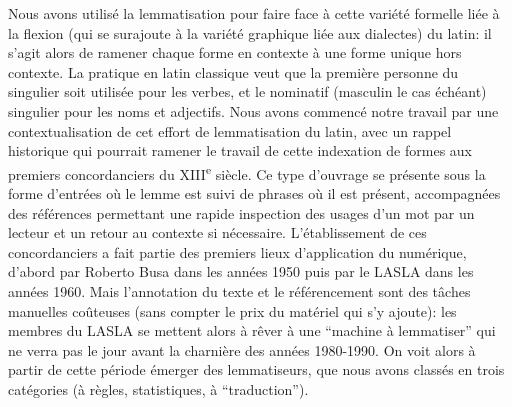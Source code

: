 Nous avons utilisé la lemmatisation pour faire face à cette variété formelle liée à la flexion (qui se surajoute à la variété graphique liée aux dialectes) du latin: il s'agit alors de ramener chaque forme en contexte à une forme unique hors contexte. La pratique en latin classique veut que la première personne du singulier soit utilisée pour les verbes, et le nominatif (masculin le cas échéant) singulier pour les noms et adjectifs. Nous avons commencé notre travail par une contextualisation de cet effort de lemmatisation du latin, avec un rappel historique qui pourrait ramener le travail de cette indexation de formes aux premiers concordanciers du XIII\textsuperscript{e} siècle. Ce type d'ouvrage se présente sous la forme d'entrées où le lemme est suivi de phrases où il est présent, accompagnées des références permettant une rapide inspection des usages d'un mot par un lecteur et un retour au contexte si nécessaire. L'établissement de ces concordanciers a fait partie des premiers lieux d'application du numérique, d'abord par Roberto Busa dans les années 1950 puis par le LASLA dans les années 1960. Mais l'annotation du texte et le référencement sont des tâches manuelles coûteuses (sans compter le prix du matériel qui s'y ajoute): les membres du LASLA se mettent alors à rêver à une \enquote{machine à lemmatiser} qui ne verra pas le jour avant la charnière des années 1980-1990. On voit alors à partir de cette période émerger des lemmatiseurs, que nous avons classés en trois catégories (à règles, statistiques, à \enquote{traduction}). 

